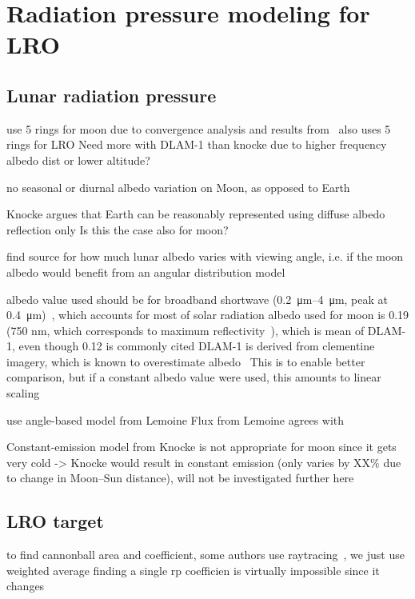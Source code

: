 \section{Radiation pressure modeling for LRO}

\subsection{Lunar radiation pressure}
use 5 rings for moon due to convergence analysis and results from~\cite{Floberghagen1999}
\cite{Nicholson2010} also uses 5 rings for LRO
Need more with DLAM-1 than knocke due to higher frequency albedo dist or lower altitude?


no seasonal or diurnal albedo variation on Moon, as opposed to Earth~\cite{Knocke1989}

Knocke argues that Earth can be reasonably represented using diffuse albedo reflection only
Is this the case also for moon?

find source for how much lunar albedo varies with viewing angle, i.e. if the moon albedo would benefit from an angular distribution model

albedo value used should be for broadband shortwave (\SIrange{0.2}{4}{\micro\meter}, peak at \SI{0.4}{\micro\meter})~\cite{Knocke1989}, which accounts for most of solar radiation
albedo used for moon is 0.19 (750 nm, which corresponds to maximum reflectivity~\cite{Floberghagen1999}), which is mean of DLAM-1, even though 0.12 is commonly cited
DLAM-1 is derived from clementine imagery, which is known to overestimate albedo~\cite{Shkuratov2011}
This is to enable better comparison, but if a constant albedo value were used, this amounts to linear scaling



use angle-based model from Lemoine
Flux from Lemoine agrees with \cite[Table~8]{Tooley2010}

Constant-emission model from Knocke is not appropriate for moon since it gets very cold -> Knocke would result in constant emission (only varies by XX\% due to change in Moon--Sun distance), will not be investigated further here

\subsection{LRO target}

to find cannonball area and coefficient, some authors use raytracing~\cite{Hattori2019}, we just use weighted average
finding a single rp coefficien is virtually impossible since it changes~\cite[p~580]{Vallado2013}


